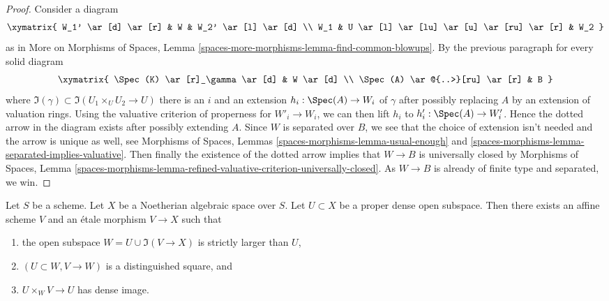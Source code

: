 \begin{proof}
\medskip\noindent
Consider a diagram
$$
\xymatrix{
W_1' \ar[d] \ar[r] & W & W_2' \ar[l] \ar[d] \\
W_1 & U \ar[l] \ar[lu] \ar[u] \ar[ru] \ar[r] & W_2
}
$$
as in More on Morphisms of Spaces, Lemma
\ref{spaces-more-morphisms-lemma-find-common-blowups}.
By the previous paragraph for every solid diagram
$$
\xymatrix{
\Spec(K) \ar[r]_\gamma  \ar[d] & W \ar[d] \\
\Spec(A) \ar@{..>}[ru] \ar[r] & B
}
$$
where $\Im(\gamma) \subset \Im(U_1 \times_U U_2 \to U)$
there is an $i$ and an extension $h_i : \Spec(A) \to W_i$ of $\gamma$
after possibly replacing $A$ by an extension of valuation rings.
Using the valuative criterion of properness for $W'_i \to W_i$,
we can then lift $h_i$ to $h'_i : \Spec(A) \to W'_i$.
Hence the dotted arrow in the diagram exists after possibly
extending $A$. Since $W$ is separated over $B$, we see that the choice
of extension isn't needed and the arrow is unique as well, see
Morphisms of Spaces, Lemmas \ref{spaces-morphisms-lemma-usual-enough}
and \ref{spaces-morphisms-lemma-separated-implies-valuative}.
Then finally the existence of the dotted arrow
implies that $W \to B$ is universally closed by
Morphisms of Spaces, Lemma
\ref{spaces-morphisms-lemma-refined-valuative-criterion-universally-closed}.
As $W \to B$ is already of finite type and separated, we win.
\end{proof}

\begin{lemma}
\label{lemma-filter-Noetherian-space}
Let $S$ be a scheme. Let $X$ be a Noetherian algebraic space over $S$.
Let $U \subset X$ be a proper dense open subspace. Then there exists an
affine scheme $V$ and an \'etale morphism $V \to X$ such that
\begin{enumerate}
\item the open subspace $W = U \cup \Im(V \to X)$ is strictly larger
than $U$,
\item $(U \subset W, V \to W)$ is a distinguished square, and
\item $U \times_W V \to U$ has dense image.
\end{enumerate}
\end{lemma}


